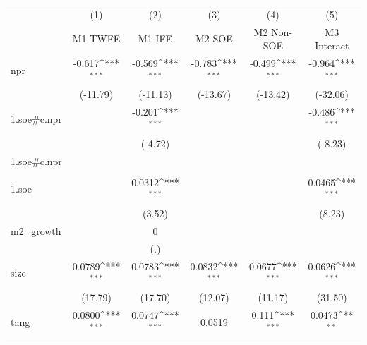 {
\def\sym#1{\ifmmode^{#1}\else\(^{#1}\)\fi}
\begin{tabular}{l*{5}{c}}
\hline\hline
            &\multicolumn{1}{c}{(1)}&\multicolumn{1}{c}{(2)}&\multicolumn{1}{c}{(3)}&\multicolumn{1}{c}{(4)}&\multicolumn{1}{c}{(5)}\\
            &\multicolumn{1}{c}{M1 TWFE}&\multicolumn{1}{c}{M1 IFE}&\multicolumn{1}{c}{M2 SOE}&\multicolumn{1}{c}{M2 Non-SOE}&\multicolumn{1}{c}{M3 Interact}\\
\hline
npr         &      -0.617\sym{***}&      -0.569\sym{***}&      -0.783\sym{***}&      -0.499\sym{***}&      -0.964\sym{***}\\
            &    (-11.79)         &    (-11.13)         &    (-13.67)         &    (-13.42)         &    (-32.06)         \\
[1em]
1.soe#c.npr &                     &      -0.201\sym{***}&                     &                     &      -0.486\sym{***}\\
            &                     &     (-4.72)         &                     &                     &     (-8.23)         \\
[1em]
1.soe#c.npr &                     &                     &                     &                     &                     \\
            &                     &                     &                     &                     &                     \\
[1em]
1.soe       &                     &      0.0312\sym{***}&                     &                     &      0.0465\sym{***}\\
            &                     &      (3.52)         &                     &                     &      (8.23)         \\
[1em]
m2\_growth   &                     &           0         &                     &                     &                     \\
            &                     &         (.)         &                     &                     &                     \\
[1em]
size        &      0.0789\sym{***}&      0.0783\sym{***}&      0.0832\sym{***}&      0.0677\sym{***}&      0.0626\sym{***}\\
            &     (17.79)         &     (17.70)         &     (12.07)         &     (11.17)         &     (31.50)         \\
[1em]
tang        &      0.0800\sym{***}&      0.0747\sym{***}&      0.0519         &       0.111\sym{***}&      0.0473\sym{**} \\

\end{tabular}}
